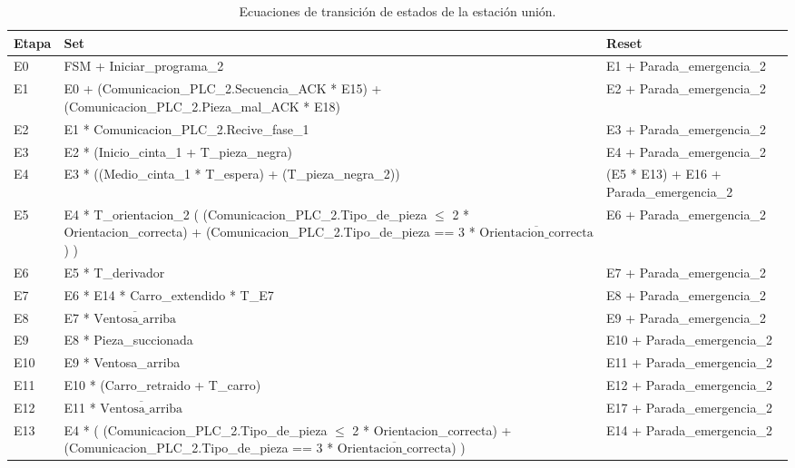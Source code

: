 \begin{table}[H]
\begin{center}

\renewcommand{\arraystretch}{1.5}
\begin{tabular}{|M{1.5cm}|M{6cm}|M{6cm}|}
\hline
\textbf{Etapa} & 
\textbf{Set} & 
\textbf{Reset} \\
\hline
E0  &  FSM + Iniciar\_programa\_2 & E1 + Parada\_emergencia\_2  \\
\hline
E1  &  E0 + (Comunicacion\_PLC\_2.Secuencia\_ACK * E15) + (Comunicacion\_PLC\_2.Pieza\_mal\_ACK * E18) & E2 + Parada\_emergencia\_2  \\
\hline
E2  &  E1 * Comunicacion\_PLC\_2.Recive\_fase\_1 & E3 + Parada\_emergencia\_2  \\
\hline
E3  &  E2 * (Inicio\_cinta\_1 + T\_pieza\_negra) & E4 + Parada\_emergencia\_2  \\
\hline
E4  &  E3 * ((Medio\_cinta\_1 * T\_espera) + (T\_pieza\_negra\_2)) & (E5 * E13) + E16 +  Parada\_emergencia\_2  \\
\hline
E5  &  E4 * T\_orientacion\_2 ( (Comunicacion\_PLC\_2.Tipo\_de\_pieza $\leq$ 2 * Orientacion\_correcta) + (Comunicacion\_PLC\_2.Tipo\_de\_pieza == 3 * $\overline{\text{Orientacion\_correcta}}$) ) & E6 + Parada\_emergencia\_2  \\
\hline
E6  &  E5 * T\_derivador & E7 + Parada\_emergencia\_2  \\
\hline
E7  &  E6 * E14 * Carro\_extendido * T\_E7 & E8 + Parada\_emergencia\_2  \\
\hline
E8  &  E7 * $\overline{\text{Ventosa\_arriba}}$ & E9 + Parada\_emergencia\_2  \\
\hline
E9 & E8 * Pieza\_succionada & E10 + Parada\_emergencia\_2  \\
\hline
E10  &  E9 * Ventosa\_arriba & E11 + Parada\_emergencia\_2  \\
\hline
E11  &  E10 * (Carro\_retraido + T\_carro) & E12 + Parada\_emergencia\_2  \\
\hline
E12  &  E11 * $\overline{\text{Ventosa\_arriba}}$ & E17 + Parada\_emergencia\_2 \\
\hline
E13  &  E4 * ( (Comunicacion\_PLC\_2.Tipo\_de\_pieza $\leq$ 2 * Orientacion\_correcta) + (Comunicacion\_PLC\_2.Tipo\_de\_pieza == 3 * $\overline{\text{Orientacion\_correcta}}$) ) & E14 + Parada\_emergencia\_2 \\
\hline
\end{tabular}

\caption{Ecuaciones de transición de estados de la estación unión.}
\label{cuadro:transiciones_union_1}
\end{center}
\end{table}

